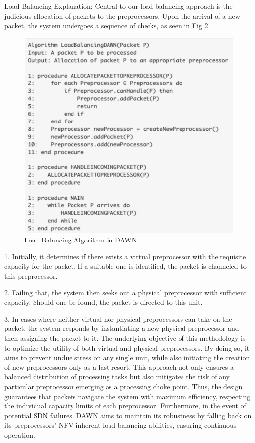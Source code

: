 \documentclass[conference]{IEEEtran}
\begin{document}
Load Balancing Explanation:
Central to our load-balancing approach is the judicious allocation of packets to the preprocessors. Upon the arrival of a new packet, the system undergoes a sequence of checks, as seen in Fig 2.


\begin{figure}[h]
\includegraphics[scale=0.46]{fig2.png}
\caption{Load Balancing Algorithm in DAWN }
\end{figure}


1. Initially, it determines if there exists a virtual preprocessor with the requisite capacity for the packet. If a suitable one is identified, the packet is channeled to this preprocessor.
  
2. Failing that, the system then seeks out a physical preprocessor with sufficient capacity. Should one be found, the packet is directed to this unit.
  
3. In cases where neither virtual nor physical preprocessors can take on the packet, the system responds by instantiating a new physical preprocessor and then assigning the packet to it.
The underlying objective of this methodology is to optimize the utility of both virtual and physical preprocessors. By doing so, it aims to prevent undue stress on any single unit, while also initiating the creation of new preprocessors only as a last resort. This approach not only ensures a balanced distribution of processing tasks but also mitigates the risk of any particular preprocessor emerging as a processing choke point. Thus, the design guarantees that packets navigate the system with maximum efficiency, respecting the individual capacity limits of each preprocessor. Furthermore, in the event of potential SDN failures, DAWN aims to maintain its robustness by falling back on its preprocessors' NFV inherent load-balancing abilities, ensuring continuous operation. 
\end{document}
